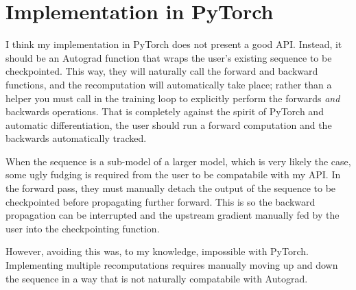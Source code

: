 \section{Implementation in PyTorch}
I think my implementation in PyTorch does not present a good API.
Instead, it should be an Autograd function that wraps the user's existing sequence to be checkpointed.
This way, they will naturally call the forward and backward functions, and the recomputation will automatically take place;
rather than a helper you must call in the training loop to explicitly perform the forwards \textit{and} backwards operations.
That is completely against the spirit of PyTorch and automatic differentiation, the user should run a forward computation and the backwards automatically tracked.

When the sequence is a sub-model of a larger model, which is very likely the case, some ugly fudging is required from the user to be compatabile with my API.
In the forward pass, they must manually detach the output of the sequence to be checkpointed before propagating further forward.
This is so the backward propagation can be interrupted and the upstream gradient manually fed by the user into the checkpointing function.

However, avoiding this was, to my knowledge, impossible with PyTorch.
Implementing multiple recomputations requires manually moving up and down the sequence in a way that is not naturally compatabile with Autograd.
